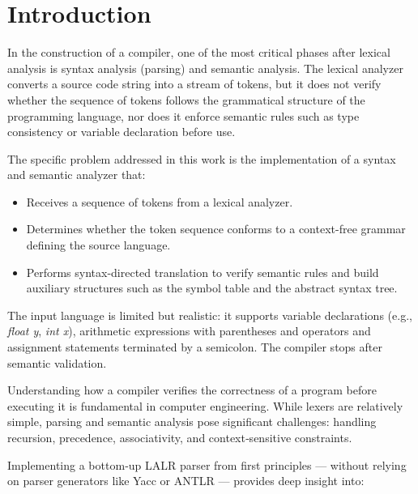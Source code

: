 \documentclass[letterpaper,12pt,oneside]{article}
\begin{document}
\tableofcontents
\clearpage
    

\section{Introduction} %
	
	In the construction of a compiler, one of the most critical phases after lexical analysis is syntax analysis (parsing) and semantic analysis. The lexical analyzer converts a source code string into a stream of tokens, but it does not verify whether the sequence of tokens follows the grammatical structure of the programming language, nor does it enforce semantic rules such as type consistency or variable declaration before use.
	
	\vspace{8pt}
	
	The specific problem addressed in this work is the implementation of a syntax and semantic analyzer that:
	
	\begin{itemize}
		\item Receives a sequence of tokens from a lexical analyzer.
		\item Determines whether the token sequence conforms to a context-free grammar defining the source language.
		\item Performs syntax-directed translation to verify semantic rules and build auxiliary structures such as the symbol table and the abstract syntax tree.
	\end{itemize}
	
	The input language is limited but realistic: it supports variable declarations (e.g., \textit{float y}, \textit{int x}), arithmetic expressions with parentheses and operators and assignment statements terminated by a semicolon. The compiler stops after semantic validation.
	
	\vspace{8pt}
	
	Understanding how a compiler verifies the correctness of a program before executing it is fundamental in computer engineering. While lexers are relatively simple, parsing and semantic analysis pose significant challenges: handling recursion, precedence, associativity, and context‑sensitive constraints.
	
	\vspace{8pt}
	
	Implementing a bottom‑up LALR parser from first principles — without relying on parser generators like Yacc or ANTLR — provides deep insight into:
	
\end{document}
